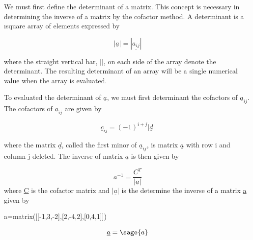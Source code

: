 \documentclass[12pt]{report}
\begin{document}
We must first define the determinant of a matrix. This concept is
necessary in determining the inverse of a matrix by the cofactor
method. A determinant is a \i{square array of elements expressed by}

\begin{equation}
	|\underline {a}| = |\underline{a_{ij}}|
\end{equation}

where the straight vertical bar, $| |$, on each side of the array denote
the determinant. The resulting determinant of an array will be a
single numerical value when the array is evaluated.

To evaluated the determinant of
$\underline{a}$, we must first determinant the
cofactors of $\underline{a}_{ij}$.
The cofactors of $\underline{a}_{ij}$ are given by

\begin{equation}
	\underline{c}_{ij}=(-1)^{i+j} |\underline{d}|
\end{equation}

where the matrix $\underline{d}$, called the first minor of
 $\underline{a}_{ij}$, is matrix $\underline{a}$ with row 
i and column j deleted. The inverse of matrix
$\underline{a}$ is then given by

\begin{equation}
	\underline{a}^{-1}=\frac{C^{T}}{|\underline{a}|}
	\label{eq:cofinverse}
\end{equation}
where \underline{C} is the cofactor matrix and $|\underline{a}|$ is 
the determine the inverse of a matrix \underline{a} given by 
\begin{sagesilent}
	a=matrix([[-1,3,-2],[2,-4,2],[0,4,1]])
\end{sagesilent}

\begin{equation}
	\underline{a} = \sage{a} 
\end{equation}
\end{document}
